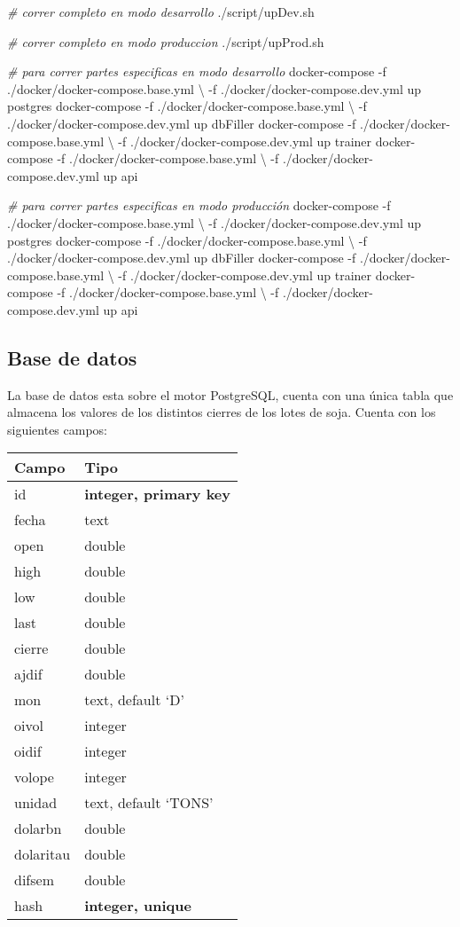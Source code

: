 \documentclass[10pt,spanish,a4paper,]{article}
\newenvironment{Shaded}{}{}
\newcommand{\CommentTok}[1]{\textcolor[rgb]{0.38,0.63,0.69}{\textit{#1}}}
\newcommand{\ExtensionTok}[1]{#1}
\newcommand{\NormalTok}[1]{#1}
\begin{document}
\begin{Shaded}
\begin{Highlighting}[]
\CommentTok{# correr completo en modo desarrollo}
\ExtensionTok{./script/upDev.sh}

\CommentTok{# correr completo en modo produccion}
\ExtensionTok{./script/upProd.sh}

\CommentTok{# para correr partes especificas en modo desarrollo}
\ExtensionTok{docker-compose}\NormalTok{ -f ./docker/docker-compose.base.yml \textbackslash{}}
\NormalTok{               -f ./docker/docker-compose.dev.yml up postgres}
\ExtensionTok{docker-compose}\NormalTok{ -f ./docker/docker-compose.base.yml \textbackslash{}}
\NormalTok{               -f ./docker/docker-compose.dev.yml up dbFiller}
\ExtensionTok{docker-compose}\NormalTok{ -f ./docker/docker-compose.base.yml \textbackslash{}}
\NormalTok{               -f ./docker/docker-compose.dev.yml up trainer}
\ExtensionTok{docker-compose}\NormalTok{ -f ./docker/docker-compose.base.yml \textbackslash{}}
\NormalTok{               -f ./docker/docker-compose.dev.yml up api}

\CommentTok{# para correr partes especificas en modo producción}
\ExtensionTok{docker-compose}\NormalTok{ -f ./docker/docker-compose.base.yml \textbackslash{}}
\NormalTok{               -f ./docker/docker-compose.dev.yml up postgres}
\ExtensionTok{docker-compose}\NormalTok{ -f ./docker/docker-compose.base.yml \textbackslash{}}
\NormalTok{               -f ./docker/docker-compose.dev.yml up dbFiller}
\ExtensionTok{docker-compose}\NormalTok{ -f ./docker/docker-compose.base.yml \textbackslash{}}
\NormalTok{               -f ./docker/docker-compose.dev.yml up trainer}
\ExtensionTok{docker-compose}\NormalTok{ -f ./docker/docker-compose.base.yml \textbackslash{}}
\NormalTok{               -f ./docker/docker-compose.dev.yml up api}
\end{Highlighting}
\end{Shaded}

\newpage

\hypertarget{base-de-datos}{%
\subsection{Base de datos}\label{base-de-datos}}

La base de datos esta sobre el motor PostgreSQL, cuenta con una única
tabla que almacena los valores de los distintos cierres de los lotes de
soja. Cuenta con los siguientes campos:

\begin{longtable}[]{@{}ll@{}}
\toprule
Campo & Tipo\tabularnewline
\midrule
\endhead
id & \textbf{integer, primary key}\tabularnewline
fecha & text\tabularnewline
open & double\tabularnewline
high & double\tabularnewline
low & double\tabularnewline
last & double\tabularnewline
cierre & double\tabularnewline
ajdif & double\tabularnewline
mon & text, default `D'\tabularnewline
oivol & integer\tabularnewline
oidif & integer\tabularnewline
volope & integer\tabularnewline
unidad & text, default `TONS'\tabularnewline
dolarbn & double\tabularnewline
dolaritau & double\tabularnewline
difsem & double\tabularnewline
hash & \textbf{integer, unique}\tabularnewline
\bottomrule
\end{longtable}
\end{document}

